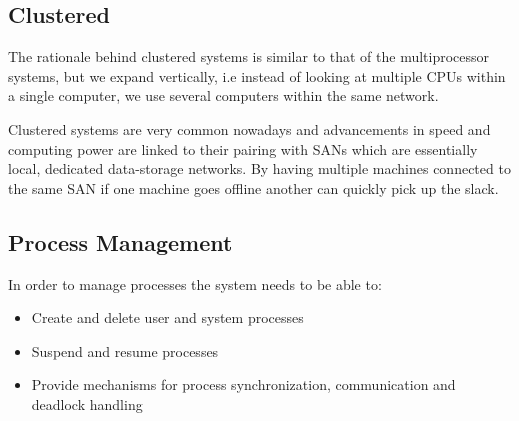 	\subsection{Clustered}

		\par{The rationale behind clustered systems is similar to that of the multiprocessor systems, but we expand vertically, i.e instead of looking at multiple CPUs within a single computer, we use several computers within the same network.}
		\par{Clustered systems are very common nowadays and advancements in speed and computing power are linked to their pairing with SANs which are essentially local, dedicated data-storage networks. By having multiple machines connected to the same SAN if one machine goes offline another can quickly pick up the slack.}





\subsection{Process Management}




	\par{In order to manage processes the system needs to be able to:}

		\begin{itemize}
			\item[]{Create and delete user and system processes}
			\item[]{Suspend and resume processes}
			\item[]{Provide mechanisms for process synchronization, communication and deadlock handling}
		\end{itemize}

